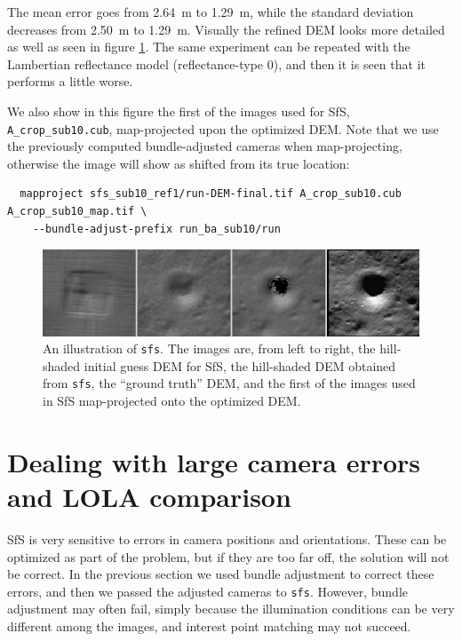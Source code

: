 The mean error goes from 2.64~m to 1.29~m, while the standard deviation
decreases from 2.50~m to 1.29~m. Visually the refined DEM looks more detailed
as well as seen in figure \ref{fig:sfs2}. The same experiment can be
repeated with the Lambertian reflectance model (reflectance-type 0), and
then it is seen that it performs a little worse. 

We also show in this figure the first of the images used for SfS,
\verb#A_crop_sub10.cub#, map-projected upon the optimized DEM. Note that
we use the previously computed bundle-adjusted cameras when
map-projecting, otherwise the image will show as shifted from its true
location:
\begin{verbatim}
  mapproject sfs_sub10_ref1/run-DEM-final.tif A_crop_sub10.cub A_crop_sub10_map.tif \
    --bundle-adjust-prefix run_ba_sub10/run
\end{verbatim}
\begin{figure}[h!]
\begin{center}
\includegraphics[width=7in]{images/sfs2.jpg}
\caption[sfs]{An illustration of \texttt{sfs}. The images are, from
  left to right, the hill-shaded initial guess DEM for SfS, the hill-shaded DEM obtained
from \texttt{sfs}, the ``ground truth'' DEM, and the first of the
images used in SfS map-projected onto the optimized DEM.}
\label{fig:sfs2}
\end{center}
\end{figure}

\section{Dealing with large camera errors and LOLA comparison}
\label{sfs-lola}

SfS is very sensitive to errors in camera positions and
orientations. These can be optimized as part of the problem, but if they
are too far off, the solution will not be correct. In the previous
section we used bundle adjustment to correct these errors, and then we
passed the adjusted cameras to \texttt{sfs}. However, bundle adjustment may
often fail, simply because the illumination conditions can be very
different among the images, and interest point matching may not succeed.

